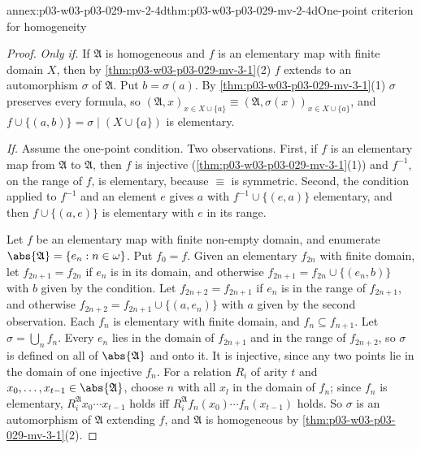 \begin{annexitem}{annex:p03-w03-p03-029-mv-2-4d}{thm:p03-w03-p03-029-mv-2-4d}{One-point criterion for homogeneity}
\begin{proof}
\emph{Only if.} If \(\mathfrak A\) is homogeneous and \(f\) is an
elementary map with finite domain \(X\), then by
\cref{thm:p03-w03-p03-029-mv-3-1}(2) \(f\) extends to an automorphism
\(\sigma\) of \(\mathfrak A\). Put \(b=\sigma(a)\). By
\cref{thm:p03-w03-p03-029-mv-3-1}(1) \(\sigma\) preserves every formula, so
\((\mathfrak A,x)_{x\in X\cup\{a\}}\equiv(\mathfrak A,\sigma(x))_{x\in
X\cup\{a\}}\), and \(f\cup\{(a,b)\}=\sigma\mathbin{|}(X\cup\{a\})\) is
elementary.

\emph{If.} Assume the one-point condition. Two observations. First, if \(f\)
is an elementary map from \(\mathfrak A\) to \(\mathfrak A\), then \(f\) is
injective (\cref{thm:p03-w03-p03-029-mv-3-1}(1)) and \(f^{-1}\), on the
range of \(f\), is elementary, because \(\equiv\) is symmetric. Second,
the condition applied to \(f^{-1}\) and an element \(e\) gives \(a\) with
\(f^{-1}\cup\{(e,a)\}\) elementary, and then \(f\cup\{(a,e)\}\) is elementary
with \(e\) in its range.

Let \(f\) be an elementary map with finite non-empty domain, and enumerate
\(\abs{\mathfrak A}=\{e_n:n\in\omega\}\). Put \(f_0=f\). Given an elementary
\(f_{2n}\) with finite domain, let \(f_{2n+1}=f_{2n}\) if \(e_n\) is in its
domain, and otherwise \(f_{2n+1}=f_{2n}\cup\{(e_n,b)\}\) with \(b\) given by the
condition. Let \(f_{2n+2}=f_{2n+1}\) if \(e_n\) is in the range of
\(f_{2n+1}\), and otherwise \(f_{2n+2}=f_{2n+1}\cup\{(a,e_n)\}\) with \(a\)
given by the second observation. Each \(f_n\) is elementary with finite
domain, and \(f_n\subseteq f_{n+1}\). Let \(\sigma=\bigcup_n f_n\). Every
\(e_n\) lies in the domain of \(f_{2n+1}\) and in the range of
\(f_{2n+2}\), so \(\sigma\) is defined on all of \(\abs{\mathfrak A}\) and
onto it. It is injective, since any two points lie in the domain of one
injective \(f_n\). For a relation \(R_i\) of arity \(t\) and
\(x_0,\ldots,x_{t-1}\in\abs{\mathfrak A}\), choose \(n\) with all \(x_l\) in
the domain of \(f_n\); since \(f_n\) is elementary, \(R_i^{\mathfrak
A}x_0\cdots x_{t-1}\) holds iff \(R_i^{\mathfrak A}f_n(x_0)\cdots
f_n(x_{t-1})\) holds. So \(\sigma\) is an automorphism of \(\mathfrak A\)
extending \(f\), and \(\mathfrak A\) is homogeneous by
\cref{thm:p03-w03-p03-029-mv-3-1}(2).
\end{proof}
\end{annexitem}


